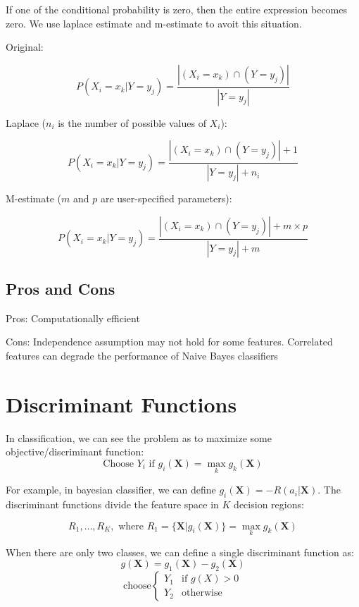 \begin{multicols*}{2}
If one of the conditional probability is zero, then the entire expression becomes zero. We use laplace estimate and m-estimate to avoit this situation. 

\noindent Original:

$$P(X_{i} = x_{k} | Y = y_{j}) = \frac{| (X_{i}=x_{k}) \cap (Y=y_{j}) |}{| Y=y_{j} |}$$

\noindent Laplace ($n_i$ is the number of possible values of $X_i$):

$$P(X_{i} = x_{k} | Y = y_{j}) = \frac{| (X_{i}=x_{k}) \cap (Y=y_{j}) | + 1}{| Y=y_{j} | + n_{i}}$$

\noindent M-estimate ($m$ and $p$ are user-specified parameters):

$$P(X_{i} = x_{k} | Y = y_{j}) = \frac{| (X_{i}=x_{k}) \cap (Y=y_{j}) |+m\times p}{| Y=y_{j} | + m}$$

\subsection{Pros and Cons}

\noindent Pros: Computationally efficient

\noindent Cons: Independence assumption may not hold for some features. Correlated features can degrade the performance of Naive Bayes classifiers

\section{Discriminant Functions}

\noindent In classification, we can see the problem as to maximize some objective/discriminant function:
$$\text{Choose }Y_i \text{ if } g_i(\mathbf{X}) = \!\max_k g_k(\mathbf{X})$$

\noindent For example, in bayesian classifier, we can define $g_i(\mathbf{X}) = - R(a_i | \mathbf{X})$. The discriminant functions divide the feature space in $K$ decision regions:

$$R_1,\ldots,R_K, \text{ where } R_1 = \{\mathbf{X}|g_i(\mathbf{X})\} =\!\max_k g_k(\mathbf{X})$$

\noindent When there are only two classes, we can define a single discriminant function as:
$$g(\mathbf{X})=g_1(\mathbf{X}) - g_2(\mathbf{X})$$
$$\text{choose}
\begin{cases}
    Y_1 & \text{if } g(X) > 0 \\
    Y_2 & \text{otherwise}
\end{cases}
$$

\end{multicols*}
